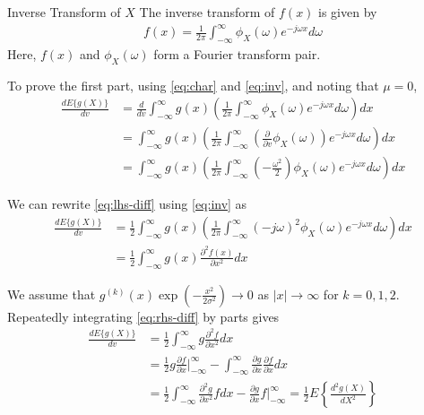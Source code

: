 \documentclass{beamer}
\begin{document}
\begin{frame}
	\begin{alertblock}{Inverse Transform of $X$}
		The inverse transform of $f(x)$ is given by
		\begin{align}
			f(x) = \frac{1}{2\pi}\int_{-\infty}^{\infty}\phi_X(\omega)e^{-j\omega x}d\omega
			\label{eq:inv}
		\end{align}
			Here, $f(x)$ and $\phi_X(\omega)$ form a Fourier transform pair.
	\end{alertblock}
	To prove the first part, using \eqref{eq:char} and \eqref{eq:inv}, and noting that $\mu = 0$,
	\begin{align}
		\frac{dE\{g(X)\}}{dv} &= \frac{d}{dv}\int_{-\infty}^{\infty}g(x)\left(\frac{1}{2\pi}\int_{-\infty}^{\infty}\phi_X(\omega)e^{-j\omega x}d\omega\right)dx \\
		&= \int_{-\infty}^{\infty}g(x)\left(\frac{1}{2\pi}\int_{-\infty}^{\infty}\left(\frac{\partial}{\partial v}\phi_X(\omega)\right)e^{-j\omega x}d\omega\right)dx \\
		&= \int_{-\infty}^{\infty}g(x)\left(\frac{1}{2\pi}\int_{-\infty}^{\infty}\left(-\frac{\omega^2}{2}\right)\phi_X(\omega)e^{-j\omega x}d\omega\right)dx
		\label{eq:lhs-diff}
	\end{align}
\end{frame}

\begin{frame}
	We can rewrite \eqref{eq:lhs-diff} using \eqref{eq:inv} as
	\begin{align}
		\frac{dE\{g(X)\}}{dv} &= \frac{1}{2}\int_{-\infty}^{\infty}g(x)\left(\frac{1}{2\pi}\int_{-\infty}^{\infty}(-j\omega)^2\phi_X(\omega)e^{-j\omega x}d\omega\right)dx \\
		&= \frac{1}{2}\int_{-\infty}^{\infty}g(x)\frac{\partial^2f(x)}{\partial x^2}dx
		\label{eq:rhs-diff}
	\end{align}

	\noindent We assume that $g^{(k)}(x)\exp{(-\frac{x^2}{2\sigma^2})} \to 0$ as $|x| \to \infty$ for $k = 0, 1, 2$. Repeatedly integrating \eqref{eq:rhs-diff} by parts gives
	\begin{align}
		\frac{dE\{g(X)\}}{dv} &= \frac{1}{2}\int_{-\infty}^{\infty}g\frac{\partial^2f}{\partial x^2}dx \\
		&= \frac{1}{2}g\frac{\partial f}{\partial x}\Big|_{-\infty}^{\infty} - \int_{-\infty}^{\infty}\frac{\partial g}{\partial x}\frac{\partial f}{\partial x}dx \\
		&= \frac{1}{2}\int_{-\infty}^{\infty}\frac{\partial^2g}{\partial x^2}fdx - \frac{\partial g}{\partial x}f\Big|_{-\infty}^{\infty} = \frac{1}{2}E\left\{\frac{d^2g(X)}{dX^2}\right\} 
		\label{eq:sol1}
	\end{align}
\end{frame}
\end{document}
